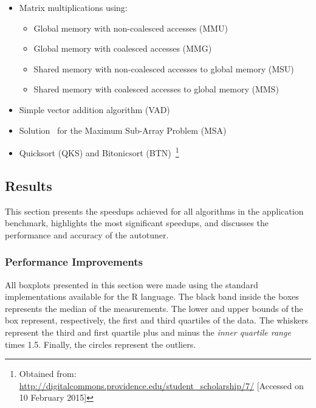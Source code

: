 \begin{itemize}
    \item Matrix multiplications using:
        \begin{itemize}
             \item Global memory with non-coalesced accesses (MMU)
             \item Global memory with coalesced accesses (MMG)
             \item Shared memory with non-coalesced accesses to global memory
                 (MSU)
             \item Shared memory with coalesced accesses to global memory (MMS)
        \end{itemize}
    \item Simple vector addition algorithm (VAD)
    \item Solution~\cite{alves2004bsp,ferreira2014parallel} for the Maximum
        Sub-Array Problem (MSA)
    \item Quicksort (QKS) and Bitonicsort (BTN)~\footnote{Obtained from:
        \url{http://digitalcommons.providence.edu/student\_scholarship/7/}
        [Accessed on 10 February 2015]}
\end{itemize}


\subsection{Results}
\label{sec:GPUresults}

This section presents the speedups achieved for all algorithms in the
application benchmark, highlights the most significant speedups, and discusses
the performance and accuracy of the autotuner.

\subsubsection{Performance Improvements}

All boxplots presented in this section were made using the standard
implementations available for the R language.  The black band inside the boxes
represents the median of the measurements. The lower and upper bounds of the
box represent, respectively, the first and third quartiles of the data. The
whiskers represent the third and first quartile plus and minus the \emph{inner
quartile range} times 1.5. Finally, the circles represent the outliers.


